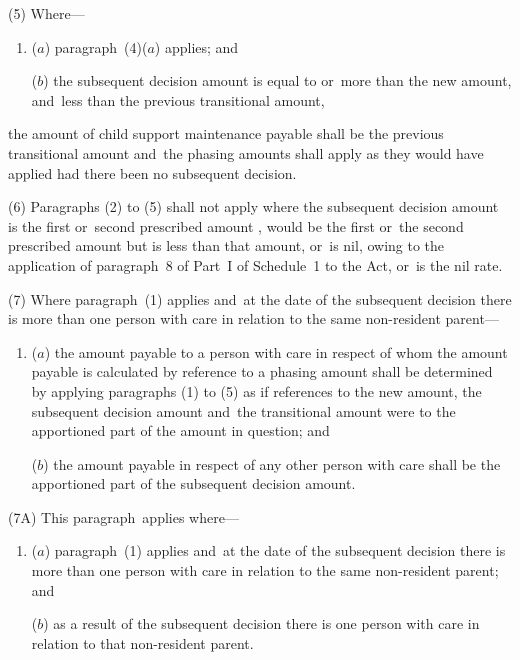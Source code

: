 \documentclass[12pt,a4paper]{article}
\begin{document}
(5) Where—
\begin{enumerate}\item[]
($a$) paragraph~(4)($a$)  applies; and

($b$) the subsequent decision amount is equal to or~more than the new amount,
and~less than the previous transitional amount,  %
\end{enumerate}
the amount of child support maintenance payable shall be the previous transitional amount and~the phasing amounts shall apply as they would have applied had there been no subsequent decision.

(6) Paragraphs (2) to (5) shall not apply where the subsequent decision amount is the first or~second prescribed amount%
, would be the first or~the second prescribed amount but is less than that amount, or~is nil, owing to the application of paragraph~8 of Part~I of Schedule~1 to the Act, or~is the nil rate.  %

(7) Where paragraph~(1) applies and~at the date of the subsequent decision there is more than one person with care in relation to the same non-resident parent—
\begin{enumerate}\item[]
($a$) the amount payable to a person with care in respect of whom the amount payable is calculated by reference to a phasing amount shall be determined by applying paragraphs (1) to (5) as if references to the new amount, the subsequent decision amount and~the transitional amount were to the apportioned part of the amount in question; and

($b$) the amount payable in respect of any other person with care shall be the apportioned part of the subsequent decision amount.
\end{enumerate}

(7A) This paragraph~applies where—
\begin{enumerate}\item[]
($a$) paragraph~(1) applies and~at the date of the subsequent decision there is more than one person with care in relation to the same non-resident parent; and

($b$) as a result of the subsequent decision there is one person with care in relation to that non-resident parent.
\end{enumerate}
\end{document}
